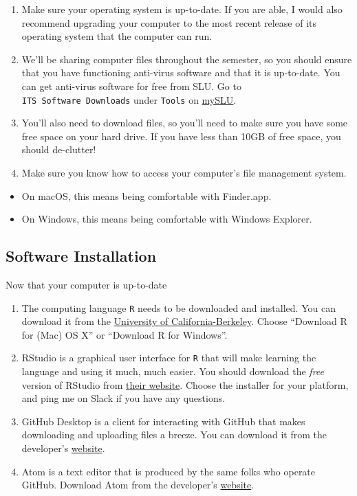 \documentclass[]{book}
\providecommand{\tightlist}{%
  \setlength{\itemsep}{0pt}\setlength{\parskip}{0pt}}
\theoremstyle{definition}
\theoremstyle{definition}
\theoremstyle{remark}
\begin{document}
\begin{enumerate}
\def\labelenumi{\arabic{enumi}.}
\item
  Make sure your operating system is up-to-date. If you are able, I
  would also recommend upgrading your computer to the most recent
  release of its operating system that the computer can run.
\item
  We'll be sharing computer files throughout the semester, so you should
  ensure that you have functioning anti-virus software and that it is
  up-to-date. You can get anti-virus software for free from SLU. Go to
  \texttt{ITS\ Software\ Downloads} under \texttt{Tools} on
  \href{https://myslu.slu.edu/tools}{mySLU}.
\item
  You'll also need to download files, so you'll need to make sure you
  have some free space on your hard drive. If you have less than 10GB of
  free space, you should de-clutter!
\item
  Make sure you know how to access your computer's file management
  system.
\end{enumerate}

\begin{itemize}
\tightlist
\item
  On macOS, this means being comfortable with Finder.app.
\item
  On Windows, this means being comfortable with Windows Explorer.
\end{itemize}

\subsection{Software Installation}\label{software-installation}

Now that your computer is up-to-date

\begin{enumerate}
\def\labelenumi{\arabic{enumi}.}
\item
  The computing language \texttt{R} needs to be downloaded and
  installed. You can download it from the
  \href{https://cran.cnr.berkeley.edu}{University of
  California-Berkeley}. Choose ``Download R for (Mac) OS X'' or
  ``Download R for Windows''.
\item
  RStudio is a graphical user interface for \texttt{R} that will make
  learning the language and using it much, much easier. You should
  download the \emph{free} version of RStudio from
  \href{https://www.rstudio.com/products/rstudio/download/\#download}{their
  website}. Choose the installer for your platform, and ping me on Slack
  if you have any questions.
\item
  GitHub Desktop is a client for interacting with GitHub that makes
  downloading and uploading files a breeze. You can download it from the
  developer's \href{http://desktop.github.com}{website}.
\item
  Atom is a text editor that is produced by the same folks who operate
  GitHub. Download Atom from the developer's
  \href{http://atom.io}{website}.
\end{enumerate}
\end{document}
